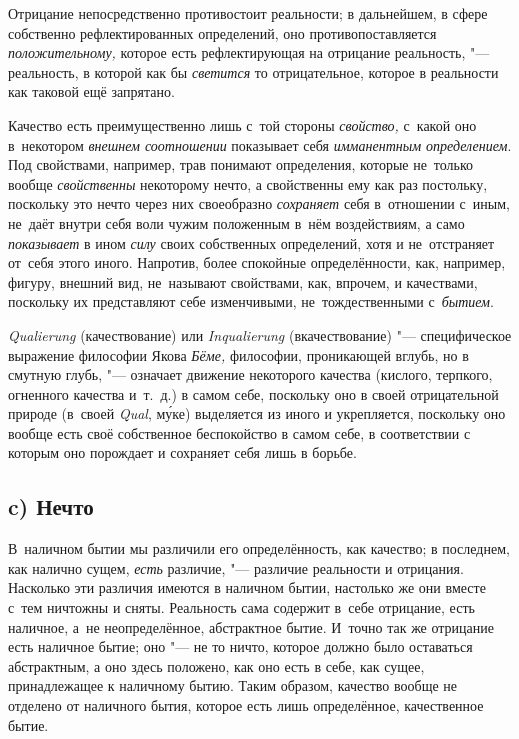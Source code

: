Отрицание непосредственно противостоит реальности; в дальнейшем, в сфере
собственно рефлектированных определений, оно противопоставляется
{\em положительному,} которое есть рефлектирующая на
отрицание реальность, "--- реальность, в которой как бы
{\em светится} то отрицательное, которое в реальности
как таковой ещё запрятано.

Качество есть преимущественно лишь с~той стороны {\em свойство,} с~какой оно
в~некотором {\em внешнем соотношении} показывает себя {\em имманентным
определением}. Под свойствами, например, трав понимают определения, которые
не~только вообще {\em свойственны} некоторому нечто, а свойственны ему как раз
постольку, поскольку это нечто через них своеобразно {\em сохраняет} себя
в~отношении с~иным, не~даёт внутри себя воли чужим положенным в~нём
воздействиям, а само {\em показывает} в ином {\em силу} своих собственных
определений, хотя и не~отстраняет от~себя этого иного. Напротив, более
спокойные определённости, как, например, фигуру, внешний вид, не~называют
свойствами, как, впрочем, и качествами, поскольку их представляют себе
изменчивыми, не~тождественными с~{\em бытием}.

{\em Quali\-erung} (качествование) или {\em Inquali\-erung} (вкачествование)
"--- специфическое выражение философии Якова {\em Бёме,} философии, проникающей
вглубь, но в смутную глубь, "--- означает движение некоторого качества
(кислого, терпкого, огненного качества и~т.~д.) в самом себе, поскольку оно в
своей отрицательной природе (в~своей {\em Qual},
м\'{у}ке) выделяется из иного и укрепляется, поскольку оно вообще есть своё
собственное беспокойство в самом себе, в соответствии с которым оно порождает
и сохраняет себя лишь в борьбе.

\subsection[c) Нечто]{c) Нечто}

В~наличном бытии мы различили его определённость, как качество; в последнем,
как налично сущем, {\em есть} различие, "--- различие реальности и отрицания.
Насколько эти различия имеются в наличном бытии, настолько же они вместе с~тем
ничтожны и сняты. Реальность сама содержит в~себе отрицание, есть наличное,
а~не неопределённое, абстрактное бытие. И~точно так же отрицание есть наличное
бытие; оно "--- не то ничто, которое должно было оставаться абстрактным, а оно
здесь положено, как оно есть в себе, как сущее, принадлежащее к наличному
бытию. Таким образом, качество вообще не отделено от наличного бытия, которое
есть лишь определённое, качественное бытие.

